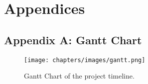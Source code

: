 \chapter{Appendices}
\section*{Appendix A: Gantt Chart}
\begin{figure}[h!]
    \centering
    \texttt{[image: chapters/images/gantt.png]}
    \caption{Gantt Chart of the project timeline.}
    \label{fig:gantt}
\end{figure}
